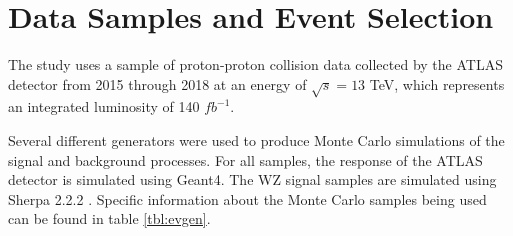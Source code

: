 \documentclass[NOTE, atlasdraft=true, texlive=2016, UKenglish]{\ATLASLATEXPATH atlasdoc}
\begin{document}
\section{Data Samples and Event Selection}
\label{sec:evt_selection}

The study uses a sample of proton-proton collision data collected by the ATLAS detector from 2015 through 2018 at an energy of $\sqrt{s} = 13$ TeV, which represents an integrated luminosity of 140 $fb^{-1}$. 

Several different generators were used to produce Monte Carlo simulations of the signal and background processes. For all samples, the response of the ATLAS detector is simulated using Geant4. The WZ signal samples are simulated using Sherpa 2.2.2 \cite{sherpa}. Specific information about the Monte Carlo samples being used can be found in table \ref{tbl:evgen}.
\end{document}
